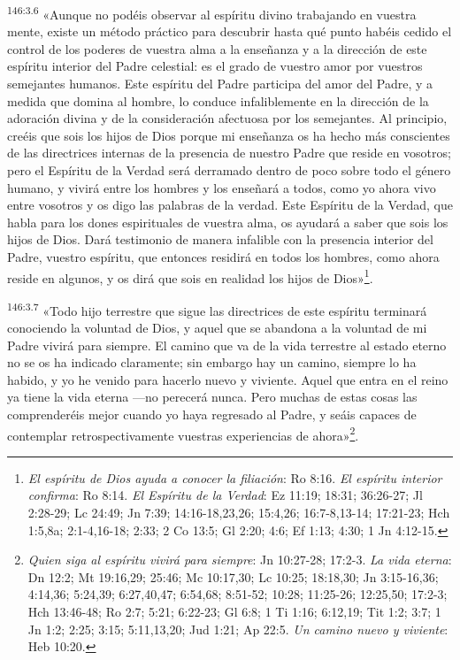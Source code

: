 \par 
\textsuperscript{146:3.6} «Aunque no podéis observar al espíritu divino trabajando en vuestra mente, existe un método práctico para descubrir hasta qué punto habéis cedido el control de los poderes de vuestra alma a la enseñanza y a la dirección de este espíritu interior del Padre celestial: es el grado de vuestro amor por vuestros semejantes humanos. Este espíritu del Padre participa del amor del Padre, y a medida que domina al hombre, lo conduce infaliblemente en la dirección de la adoración divina y de la consideración afectuosa por los semejantes. Al principio, creéis que sois los hijos de Dios porque mi enseñanza os ha hecho más conscientes de las directrices internas de la presencia de nuestro Padre que reside en vosotros; pero el Espíritu de la Verdad será derramado dentro de poco sobre todo el género humano, y vivirá entre los hombres y los enseñará a todos, como yo ahora vivo entre vosotros y os digo las palabras de la verdad. Este Espíritu de la Verdad, que habla para los dones espirituales de vuestra alma, os ayudará a saber que sois los hijos de Dios. Dará testimonio de manera infalible con la presencia interior del Padre, vuestro espíritu, que entonces residirá en todos los hombres, como ahora reside en algunos, y os dirá que sois en realidad los hijos de Dios»\footnote{\textit{El espíritu de Dios ayuda a conocer la filiación}: Ro 8:16. \textit{El espíritu interior confirma}: Ro 8:14. \textit{El Espíritu de la Verdad}: Ez 11:19; 18:31; 36:26-27; Jl 2:28-29; Lc 24:49; Jn 7:39; 14:16-18,23,26; 15:4,26; 16:7-8,13-14; 17:21-23; Hch 1:5,8a; 2:1-4,16-18; 2:33; 2 Co 13:5; Gl 2:20; 4:6; Ef 1:13; 4:30; 1 Jn 4:12-15.}.

\par 
\textsuperscript{146:3.7} «Todo hijo terrestre que sigue las directrices de este espíritu terminará conociendo la voluntad de Dios, y aquel que se abandona a la voluntad de mi Padre vivirá para siempre. El camino que va de la vida terrestre al estado eterno no se os ha indicado claramente; sin embargo hay un camino, siempre lo ha habido, y yo he venido para hacerlo nuevo y viviente. Aquel que entra en el reino ya tiene la vida eterna ---no perecerá nunca. Pero muchas de estas cosas las comprenderéis mejor cuando yo haya regresado al Padre, y seáis capaces de contemplar retrospectivamente vuestras experiencias de ahora»\footnote{\textit{Quien siga al espíritu vivirá para siempre}: Jn 10:27-28; 17:2-3. \textit{La vida eterna}: Dn 12:2; Mt 19:16,29; 25:46; Mc 10:17,30; Lc 10:25; 18:18,30; Jn 3:15-16,36; 4:14,36; 5:24,39; 6:27,40,47; 6:54,68; 8:51-52; 10:28; 11:25-26; 12:25,50; 17:2-3; Hch 13:46-48; Ro 2:7; 5:21; 6:22-23; Gl 6:8; 1 Ti 1:16; 6:12,19; Tit 1:2; 3:7; 1 Jn 1:2; 2:25; 3:15; 5:11,13,20; Jud 1:21; Ap 22:5. \textit{Un camino nuevo y viviente}: Heb 10:20.}.

